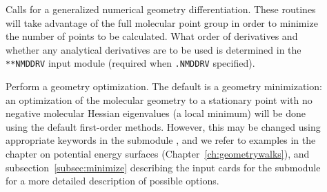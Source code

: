 \begin{description}
\item[] Calls for a generalized numerical geometry
differentiation. These routines will take advantage of the full
molecular point group in order to minimize the number of points to be
calculated. What order of derivatives and whether any analytical
derivatives are to be used is determined in the \verb|**NMDDRV| input
module (required when \texttt{.NMDDRV} specified).

\item[] Perform a geometry optimization.
The default is a geometry minimization:
an optimization of the molecular geometry to a stationary point with no
negative molecular Hessian eigenvalues
(a local minimum) will be done using the default first-order
methods. However, this may be changed using appropriate
keywords in the submodule , and we refer to examples in
the chapter on potential energy surfaces
(Chapter~\ref{ch:geometrywalks}), and subsection~\ref{subsec:minimize}
describing the input cards for the  submodule for a more
detailed description of possible options.


%


\end{description}
